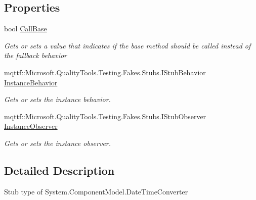 \subsection*{Properties}
\begin{DoxyCompactItemize}
\item 
bool \hyperlink{class_system_1_1_component_model_1_1_fakes_1_1_stub_date_time_converter_a8d56d865f58c86e4e35e4a1ea4221f24}{Call\-Base}
\begin{DoxyCompactList}\small\item\em Gets or sets a value that indicates if the base method should be called instead of the fallback behavior\end{DoxyCompactList}\item 
mqttf\-::\-Microsoft.\-Quality\-Tools.\-Testing.\-Fakes.\-Stubs.\-I\-Stub\-Behavior \hyperlink{class_system_1_1_component_model_1_1_fakes_1_1_stub_date_time_converter_ae2a4d664b00b0974d7042261c70dc5bd}{Instance\-Behavior}
\begin{DoxyCompactList}\small\item\em Gets or sets the instance behavior.\end{DoxyCompactList}\item 
mqttf\-::\-Microsoft.\-Quality\-Tools.\-Testing.\-Fakes.\-Stubs.\-I\-Stub\-Observer \hyperlink{class_system_1_1_component_model_1_1_fakes_1_1_stub_date_time_converter_af1d70143dfb62649192a3e85f0a38b4a}{Instance\-Observer}
\begin{DoxyCompactList}\small\item\em Gets or sets the instance observer.\end{DoxyCompactList}\end{DoxyCompactItemize}


\subsection{Detailed Description}
Stub type of System.\-Component\-Model.\-Date\-Time\-Converter



